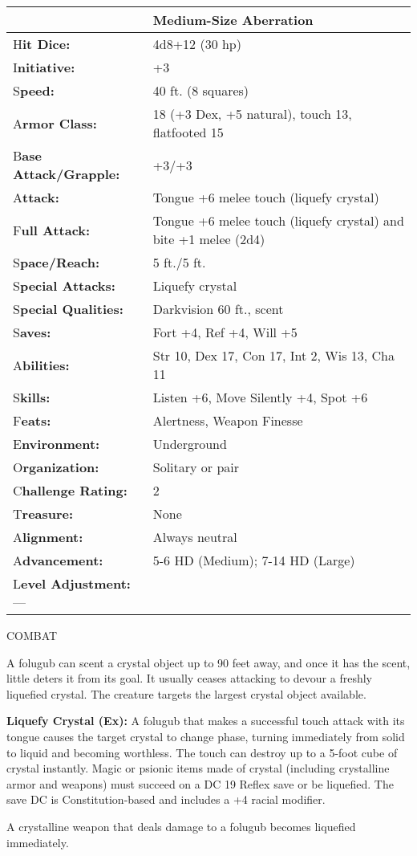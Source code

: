 \documentclass{article}
\begin{document}
\begin{tabular}{|>{\raggedright}p{85pt}|>{\raggedright}p{240pt}|}
\hline
  & Medium-Size Aberration\tabularnewline
\hline
H\textbf{it Dice:} & 4d8+12 (30 hp)\tabularnewline
\hline
I\textbf{nitiative:} & +3\tabularnewline
\hline
S\textbf{peed:} & 40 ft. (8 squares)\tabularnewline
\hline
A\textbf{rmor Class:} & 18 (+3 Dex, +5 natural), touch 13, flatfooted 15\tabularnewline
\hline
B\textbf{ase Attack/Grapple:} & +3/+3\tabularnewline
\hline
A\textbf{ttack:} & Tongue +6 melee touch (liquefy crystal)\tabularnewline
\hline
F\textbf{ull Attack:} & Tongue +6 melee touch (liquefy crystal) and bite +1 melee 
(2d4)\tabularnewline
\hline
S\textbf{pace/Reach:} & 5 ft./5 ft.\tabularnewline
\hline
S\textbf{pecial Attacks:} & Liquefy crystal\tabularnewline
\hline
S\textbf{pecial Qualities:} & Darkvision 60 ft., scent\tabularnewline
\hline
S\textbf{aves:} & Fort +4, Ref +4, Will +5\tabularnewline
\hline
A\textbf{bilities:} & Str 10, Dex 17, Con 17, Int 2, Wis 13, Cha 11\tabularnewline
\hline
S\textbf{kills:} & Listen +6, Move Silently +4, Spot +6\tabularnewline
\hline
F\textbf{eats:} & Alertness, Weapon Finesse\tabularnewline
\hline
E\textbf{nvironment:} & Underground\tabularnewline
\hline
O\textbf{rganization:} & Solitary or pair\tabularnewline
\hline
C\textbf{hallenge Rating:} & 2\tabularnewline
\hline
T\textbf{reasure:} & None\tabularnewline
\hline
A\textbf{lignment:} & Always neutral\tabularnewline
\hline
A\textbf{dvancement:} & 5-6 HD (Medium); 7-14 HD (Large)\tabularnewline
\hline
L\textbf{evel Adjustment:}--- & \tabularnewline
\hline
\end{tabular}

COMBAT

A folugub can scent a crystal object up to 90 feet away, and once it has the scent, 
little deters it from its goal. It usually ceases attacking to devour a freshly 
liquefied crystal. The creature targets the largest crystal object available.

\textbf{Liquefy Crystal (Ex):} A folugub that makes a successful touch attack with 
its tongue causes the target crystal to change phase, turning immediately from 
solid to liquid and becoming worthless. The touch can destroy up to a 5-foot cube 
of crystal instantly. Magic or psionic items made of crystal (including crystalline 
armor and weapons) must succeed on a DC 19 Reflex save or be liquefied. The save 
DC is Constitution-based and includes a +4 racial modifier.

A crystalline weapon that deals damage to a folugub becomes liquefied immediately.
\end{document}
